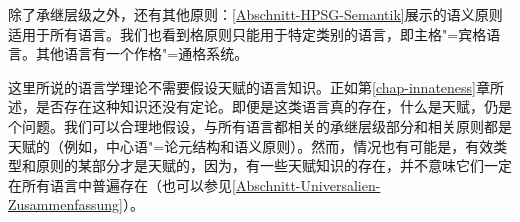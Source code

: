 
除了承继层级之外，还有其他原则：\ref{Abschnitt-HPSG-Semantik}展示的语义原则适用于所有语言。我们也看到格原则只能用于特定类别的语言，即主格"=宾格语言。其他语言有一个作格"=通格系统。

这里所说的语言学理论不需要假设天赋的语言知识。正如第\ref{chap-innateness}章所述，是否存在这种知识还没有定论。即便是这类语言真的存在，什么是天赋，仍是个问题。我们可以合理地假设，与所有语言都相关的承继层级部分和相关原则都是天赋的（例如，中心语"=论元结构和语义原则）。然而，情况也有可能是，有效类型和原则的某部分才是天赋的，因为，有一些天赋知识的存在，并不意味它们一定在所有语言中普遍存在（也可以参见\ref{Abschnitt-Universalien-Zusammenfassung}）。

